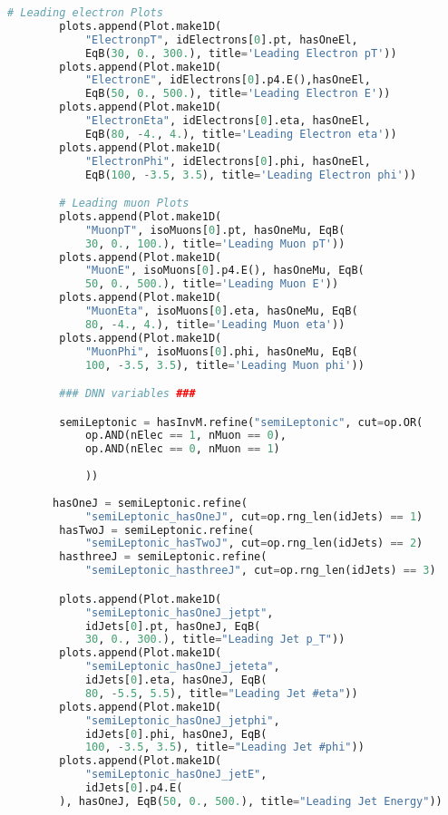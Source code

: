 \begin{lstlisting}[language=Python, caption=Python module of the analysis used in Bamboo framework, label={bamboocode}]
        # Leading electron Plots
        plots.append(Plot.make1D(
            "ElectronpT", idElectrons[0].pt, hasOneEl,
            EqB(30, 0., 300.), title='Leading Electron pT'))
        plots.append(Plot.make1D(
            "ElectronE", idElectrons[0].p4.E(),hasOneEl,
            EqB(50, 0., 500.), title='Leading Electron E'))
        plots.append(Plot.make1D(
            "ElectronEta", idElectrons[0].eta, hasOneEl,
            EqB(80, -4., 4.), title='Leading Electron eta'))
        plots.append(Plot.make1D(
            "ElectronPhi", idElectrons[0].phi, hasOneEl,
            EqB(100, -3.5, 3.5), title='Leading Electron phi'))

        # Leading muon Plots
        plots.append(Plot.make1D(
            "MuonpT", isoMuons[0].pt, hasOneMu, EqB(
            30, 0., 100.), title='Leading Muon pT'))
        plots.append(Plot.make1D(
            "MuonE", isoMuons[0].p4.E(), hasOneMu, EqB(
            50, 0., 500.), title='Leading Muon E'))
        plots.append(Plot.make1D(
            "MuonEta", isoMuons[0].eta, hasOneMu, EqB(
            80, -4., 4.), title='Leading Muon eta'))
        plots.append(Plot.make1D(
            "MuonPhi", isoMuons[0].phi, hasOneMu, EqB(
            100, -3.5, 3.5), title='Leading Muon phi'))

        ### DNN variables ###

        semiLeptonic = hasInvM.refine("semiLeptonic", cut=op.OR(
            op.AND(nElec == 1, nMuon == 0),
            op.AND(nElec == 0, nMuon == 1)
            
            ))
 
       hasOneJ = semiLeptonic.refine(
            "semiLeptonic_hasOneJ", cut=op.rng_len(idJets) == 1)
        hasTwoJ = semiLeptonic.refine(
            "semiLeptonic_hasTwoJ", cut=op.rng_len(idJets) == 2)
        hasthreeJ = semiLeptonic.refine(
            "semiLeptonic_hasthreeJ", cut=op.rng_len(idJets) == 3)

        plots.append(Plot.make1D(
            "semiLeptonic_hasOneJ_jetpt",
            idJets[0].pt, hasOneJ, EqB(
            30, 0., 300.), title="Leading Jet p_T"))
        plots.append(Plot.make1D(
            "semiLeptonic_hasOneJ_jeteta",
            idJets[0].eta, hasOneJ, EqB(
            80, -5.5, 5.5), title="Leading Jet #eta"))
        plots.append(Plot.make1D(
            "semiLeptonic_hasOneJ_jetphi",
            idJets[0].phi, hasOneJ, EqB(
            100, -3.5, 3.5), title="Leading Jet #phi"))
        plots.append(Plot.make1D(
            "semiLeptonic_hasOneJ_jetE",
            idJets[0].p4.E(
        ), hasOneJ, EqB(50, 0., 500.), title="Leading Jet Energy"))


\end{lstlisting}
